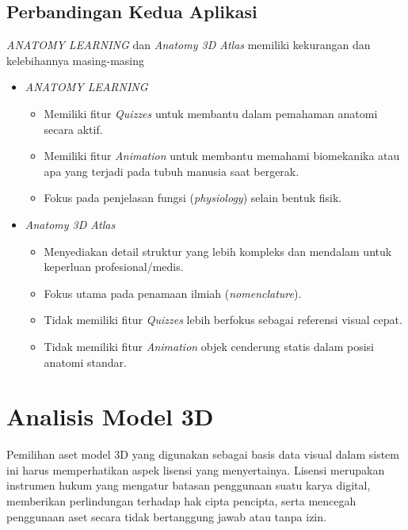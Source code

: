        \subsection {Perbandingan Kedua Aplikasi}
       \textit{ ANATOMY LEARNING} dan \textit{Anatomy 3D Atlas }memiliki kekurangan dan kelebihannya masing-masing 
        \begin{itemize}
            \item \textit{ANATOMY LEARNING} 
                \begin{itemize}
                    \item Memiliki fitur \textit{Quizzes} untuk membantu dalam pemahaman anatomi secara aktif.
                    \item Memiliki fitur \textit{Animation} untuk membantu memahami biomekanika atau apa yang terjadi pada tubuh manusia saat bergerak.
                    \item Fokus pada penjelasan fungsi (\textit{physiology}) selain bentuk fisik.
                \end{itemize}
                
            \item \textit{Anatomy 3D Atlas} 
                \begin{itemize}
                    \item Menyediakan detail struktur yang lebih kompleks dan mendalam untuk keperluan profesional/medis.
                    \item Fokus utama pada penamaan ilmiah (\textit{nomenclature}).
                    \item Tidak memiliki fitur \textit{Quizzes} lebih berfokus sebagai referensi visual cepat.
                    \item Tidak memiliki fitur \textit{Animation} objek cenderung statis dalam posisi anatomi standar.
                \end{itemize}
        \end{itemize}
        
    \section{Analisis Model 3D}
        Pemilihan aset model 3D yang digunakan sebagai basis data visual dalam sistem ini harus memperhatikan aspek lisensi yang menyertainya. Lisensi merupakan instrumen hukum yang mengatur batasan penggunaan suatu karya digital, memberikan perlindungan terhadap hak cipta pencipta, serta mencegah penggunaan aset secara tidak bertanggung jawab atau tanpa izin. 
        
